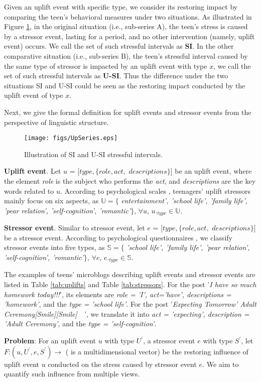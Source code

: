 Given an uplift event with specific type,
we consider its restoring impact by comparing the teen's behavioral measures under two situations.
As illustrated in Figure \ref{fig:SI},
in the original situation (i.e., sub-series A),
the teen's stress is caused by a stressor event, lasting for a period,
and no other intervention (namely, uplift event) occurs.
We call the set of such stressful intervals as \textbf{SI}.
In the other comparative situation (i.e., sub-series B),
the teen's stressful interval caused by the same type of stressor is impacted by an uplift event with type $x$,
we call the set of such stressful intervals as \textbf{U-SI}.
Thus the difference under the two situations SI and U-SI could be seen as the restoring impact conducted by the uplift event of type $x$.

Next, we give the formal definition for uplift events and stressor events from the perspective of linguistic structure.

\begin{figure}
\centering
\caption{Illustration of SI and U-SI stressful intervals.}
\texttt{[image: figs/UpSeries.eps]}
\label{fig:SI}
\end{figure}
\begin{definition}
\textbf{Uplift event}.
Let $u$ = $[type,\{role, act,$ $descriptions\}]$ be an uplift event,
where the element \emph{role} is the subject who performs the \emph{act},
and \emph{descriptions} are the key words related to $u$.
According to psychological scales \cite{hassles,Jun2008Influence},
teenagers' uplift stressors mainly focus on six aspects,
as $\mathbb{U} =\{$ \emph{entertainment', 'school life', 'family life',
'pear relation', 'self-cognition', 'romantic'}$\}$, $\forall u$, $u._{type} \in \mathbb{U}$.
\end{definition}

\begin{definition}
\textbf{Stressor event}.
Similar to stressor event,
let $e$ = $[type,\{role, act,$ $descriptions\}]$ be a stressor event.
According to psychological questionnaires \cite{Kanner1981Comparison, scale1, scale2, scale3},
we classify stressor events into five types, as $\mathbb{S}=\{$ \emph{'school life', 'family life',
'pear relation', 'self-cognition', 'romantic'}$\}$, $\forall e$, $e._{type} \in \mathbb{S}$.
\end{definition}

The examples of teens' microblogs describing uplift events and stressor events are listed in Table \ref{tab:uplifts} and Table \ref{tab:stressors}.
For the post '\emph{I have so much homework today!!!}', its elements are \emph{role = 'I', act='have', descriptions = 'homework'}, and the \emph{type = 'school life'}.
For the post '\emph{Expecting Tomorrow' Adult Ceremony[Smile][Smile]~~}', we translate it into \emph{act = 'expecting', description = 'Adult Ceremony'}, and the \emph{type = 'self-cognition'}.

\textbf{Problem}: For an uplift event $u$ with type $U^{'}$,
a stressor event $e$ with type $S^{'}$,
let $F$:$(u, U^{'}, e, S^{'}) \rightarrow $ 
( is a multidimensional vector) be the restoring influence of uplift event $u$
conducted on the stress caused by stressor event $e$.
We aim to quantify such influence  from multiple views.